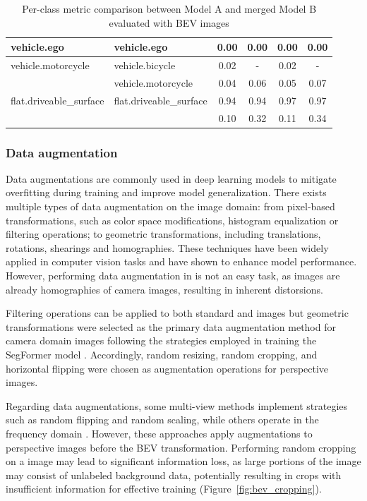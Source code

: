 \begin{table}[ht]
\begin{tabular}{llcccc}
    vehicle.ego & vehicle.ego & 0.00 & 0.00 & 0.00 & 0.00 \\
    \midrule
    vehicle.motorcycle & vehicle.bicycle & 0.02 & - & 0.02 & - \\
     & vehicle.motorcycle & 0.04 & 0.06 & 0.05 & 0.07 \\
    \midrule
    flat.driveable\_surface & flat.driveable\_surface & 0.94 & 0.94 & 0.97 & 0.97 \\
    \bottomrule
     & & 0.10 & 0.32 & 0.11 & 0.34 \\
    \bottomrule
    \end{tabular}
    \caption{Per-class metric comparison between Model A and merged Model B evaluated with BEV images}
    \label{tab:merging_comparison_bev}
\end{table}
    



\subsubsection{Data augmentation} \label{sec:data_augmentation}
Data augmentations are commonly used in deep learning models to mitigate overfitting during training and improve model generalization. There exists multiple types of data augmentation on the image domain: from pixel-based transformations, such as color space modifications, histogram equalization or filtering operations; to geometric transformations, including translations, rotations, shearings and homographies. These techniques have been widely applied in computer vision tasks and have shown to enhance model performance. However, performing data augmentation in  is not an easy task, as  images are already homographies of camera images, resulting in inherent distorsions.

Filtering operations can be applied to both standard and  images but geometric transformations were selected as the primary data augmentation method for camera domain images following the strategies employed in training the SegFormer model \cite{segformer}. Accordingly, random resizing, random cropping, and horizontal flipping were chosen as augmentation operations for perspective images.

Regarding  data augmentations, some multi-view methods implement strategies such as random flipping and random scaling, while others operate in the frequency domain \cite{HSDA}. However, these approaches apply augmentations to perspective images before the BEV transformation. Performing random cropping on a  image may lead to significant information loss, as large portions of the image may consist of unlabeled background data, potentially resulting in crops with insufficient information for effective training (Figure~\ref{fig:bev_cropping}). 

